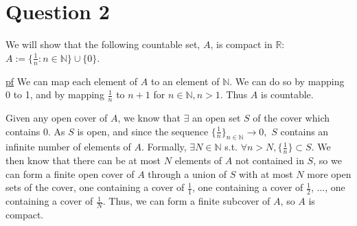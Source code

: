 \documentclass[11pt]{article} %
\begin{document}
%


\section{Question 2}
We will show that the following countable set, $A$, is compact in $\mathbb{R}$: $A:= \{ \frac{1}{n}: n \in \mathbb{N}\} \cup \{ 0 \}$.

\underline{pf} We can map each element of $A$ to an element of $\mathbb{N}$. We can do so by mapping 0 to 1, and by mapping $\frac{1}{n}$ to $n+1$ for $n \in \mathbb{N}, n>1.$ Thus $A$ is countable.

Given any open cover of $A$, we know that $\exists$ an open set $S$ of the cover which contains 0. As $S$ is open, and since the sequence $\{\frac{1}{n}\}_{n \in \mathbb{N}} \rightarrow 0,$ $S$ contains an infinite number of elements of $A$. Formally, $\exists N \in \mathbb{N}$ s.t. $\forall n>N, \{\frac{1}{n}\}\subset S$. We then know that there can be at most $N$ elements of $A$ not contained in $S$, so we can form a finite open cover of $A$ through a union of $S$ with at most $N$ more open sets of the cover, one containing a cover of $\frac{1}{1}$, one containing a cover of $\frac{1}{2}$, $\dots$, one containing a cover of $\frac{1}{N}$. Thus, we can form a finite subcover of $A$, so $A$ is compact.
\end{document}
